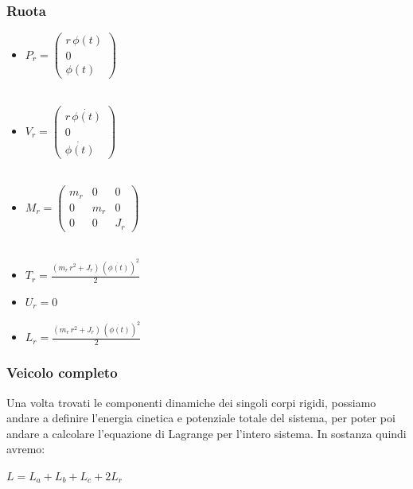 \subsubsection{Ruota}
\begin{itemize}
	
	\item \textbf{$P_r = \left(\begin{array}{c}
		r\,\phi \left(t\right)\\
		0\\
		\phi \left(t\right)
		\end{array}\right)$}
	\\\\
	\item \textbf{$V_r = \left(\begin{array}{c}
		r\,\dot{\phi \left(t\right)}\\
		0\\
		\dot{\phi \left(t\right)}
		\end{array}\right)$}
	\\\\
	\item \textbf{$M_r = \left(\begin{array}{ccc}
		m_r  & 0 & 0\\
		0 & m_r  & 0\\
		0 & 0 & J_r 
		\end{array}\right)$} \label{matrix:mr}
	\\\\
	\item \textbf{$T_r = \frac{{\left(m_r \,r^2 +J_r \right)}\,{{\left(\dot{\phi \left(t\right)}\right)}}^2 }{2}$}
	\\
	\item \textbf{$U_r = 0$}
	\\
	\item \textbf{$L_r = \frac{{\left(m_r \,r^2 +J_r \right)}\,{{\left(\dot{\phi \left(t\right)}\right)}}^2 }{2}$}
\end{itemize}

\subsubsection{Veicolo completo}
Una volta trovati le componenti dinamiche dei singoli corpi rigidi, possiamo andare a definire l'energia cinetica e potenziale totale del sistema, per poter poi andare a calcolare l'equazione di Lagrange per l'intero sistema.
In sostanza quindi avremo:
\begin{center}
	$L = L_a + L_b + L_c + 2 L_r$
\end{center}

